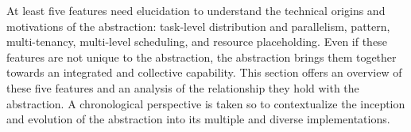 \documentclass{sig-alternate}
\begin{document}







At least five features need elucidation to understand the technical origins and
motivations of the \pilot abstraction: task-level distribution and parallelism,
\MW pattern, multi-tenancy, multi-level scheduling, and resource placeholding.
Even if these features are not unique to the \pilot abstraction, the \pilot
abstraction brings them together towards an integrated and collective
capability. This section offers an overview of these five features and an
analysis of the relationship they hold with the \pilot abstraction. A
chronological perspective is taken so to contextualize the inception and
evolution of the \pilot abstraction into its multiple and diverse
implementations.
\end{document}
